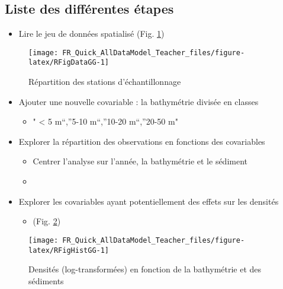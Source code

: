\documentclass[french,a4paper]{article}
\providecommand{\tightlist}{%
  \setlength{\itemsep}{0pt}\setlength{\parskip}{0pt}}
\begin{document}
\subsection{Liste des différentes
étapes}\label{liste-des-differentes-etapes}

\begin{itemize}
\tightlist
\item
  Lire le jeu de données spatialisé (Fig. \ref{fig:RFigDataGG})
\end{itemize}



\begin{figure}[!h]

{\centering \texttt{[image: FR\_Quick\_AllDataModel\_Teacher\_files/figure-latex/RFigDataGG-1]} 

}

\caption{Répartition des stations d'échantillonnage}\label{fig:RFigDataGG}
\end{figure}

\begin{itemize}
\tightlist
\item
  Ajouter une nouvelle covariable : la bathymétrie divisée en classes

  \begin{itemize}
  \tightlist
  \item
    " \textless{} 5 m``,''5-10 m``,''10-20 m``,''20-50 m"
  \end{itemize}
\item
  Explorer la répartition des observations en fonctions des covariables

  \begin{itemize}
  \tightlist
  \item
    Centrer l'analyse sur l'année, la bathymétrie et le sédiment
  \item
  \end{itemize}
\item
  Explorer les covariables ayant potentiellement des effets sur les
  densités

  \begin{itemize}
  \tightlist
  \item
    (Fig.
    \ref{fig:RFigHistGG})
  \end{itemize}
\end{itemize}




\begin{figure}[!h]

{\centering \texttt{[image: FR\_Quick\_AllDataModel\_Teacher\_files/figure-latex/RFigHistGG-1]} 

}

\caption{Densités (log-transformées) en fonction de la
bathymétrie et des sédiments}\label{fig:RFigHistGG}
\end{figure}
\end{document}
